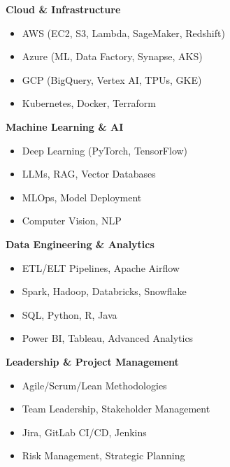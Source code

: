 \documentclass[10pt, letterpaper]{article}
\begin{document}
\begin{tcolorbox}[enhanced, frame hidden, interior hidden, 
    left=10pt, right=10pt, top=5pt, bottom=5pt]

\begin{minipage}{0.48\textwidth}
\textbf{\textcolor{primaryColor}{Cloud \& Infrastructure}}

\vspace{0.8ex}
\begin{itemize}[leftmargin=*, itemsep=0.2ex, topsep=0ex]
    \item AWS (EC2, S3, Lambda, SageMaker, Redshift)
    \item Azure (ML, Data Factory, Synapse, AKS)
    \item GCP (BigQuery, Vertex AI, TPUs, GKE)
    \item Kubernetes, Docker, Terraform
\end{itemize}

\vspace{1.2ex}
\textbf{\textcolor{primaryColor}{Machine Learning \& AI}}

\vspace{0.8ex}
\begin{itemize}[leftmargin=*, itemsep=0.2ex, topsep=0ex]
    \item Deep Learning (PyTorch, TensorFlow)
    \item LLMs, RAG, Vector Databases
    \item MLOps, Model Deployment
    \item Computer Vision, NLP
\end{itemize}
\end{minipage}
\hfill
\begin{minipage}{0.48\textwidth}
\textbf{\textcolor{primaryColor}{Data Engineering \& Analytics}}

\vspace{0.8ex}
\begin{itemize}[leftmargin=*, itemsep=0.2ex, topsep=0ex]
    \item ETL/ELT Pipelines, Apache Airflow
    \item Spark, Hadoop, Databricks, Snowflake
    \item SQL, Python, R, Java
    \item Power BI, Tableau, Advanced Analytics
\end{itemize}

\vspace{1.2ex}
\textbf{\textcolor{primaryColor}{Leadership \& Project Management}}

\vspace{0.8ex}
\begin{itemize}[leftmargin=*, itemsep=0.2ex, topsep=0ex]
    \item Agile/Scrum/Lean Methodologies
    \item Team Leadership, Stakeholder Management
    \item Jira, GitLab CI/CD, Jenkins
    \item Risk Management, Strategic Planning
\end{itemize}
\end{minipage}

\end{tcolorbox}
\end{document}
